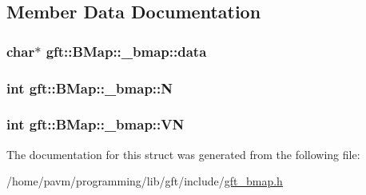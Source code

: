 \subsection{Member Data Documentation}
\hypertarget{structgft_1_1BMap_1_1__bmap_ae3e7927d064a7336798b41c25f775752}{
\subsubsection[{data}]{\setlength{\rightskip}{0pt plus 5cm}char$\ast$ gft\-::\-B\-Map\-::\-\_\-bmap\-::data}}\label{structgft_1_1BMap_1_1__bmap_ae3e7927d064a7336798b41c25f775752}
\hypertarget{structgft_1_1BMap_1_1__bmap_ae6e8644f37ce49bafb0a6227afcf2a3b}{
\subsubsection[{N}]{\setlength{\rightskip}{0pt plus 5cm}int gft\-::\-B\-Map\-::\-\_\-bmap\-::\-N}}\label{structgft_1_1BMap_1_1__bmap_ae6e8644f37ce49bafb0a6227afcf2a3b}
\hypertarget{structgft_1_1BMap_1_1__bmap_a9cdac1fc2425919764aff0630ef907d2}{
\subsubsection[{V\-N}]{\setlength{\rightskip}{0pt plus 5cm}int gft\-::\-B\-Map\-::\-\_\-bmap\-::\-V\-N}}\label{structgft_1_1BMap_1_1__bmap_a9cdac1fc2425919764aff0630ef907d2}


The documentation for this struct was generated from the following file\-:\begin{DoxyCompactItemize}
\item 
/home/pavm/programming/lib/gft/include/\hyperlink{gft__bmap_8h}{gft\-\_\-bmap.\-h}\end{DoxyCompactItemize}
